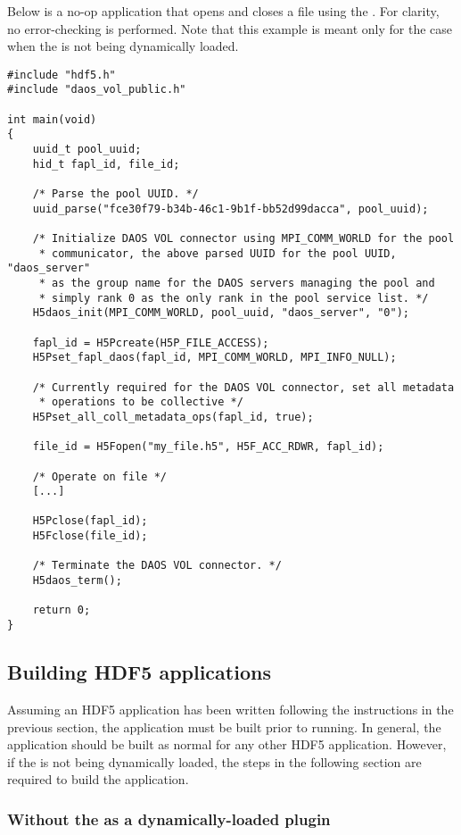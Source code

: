 \documentclass[../users_guide.tex]{subfiles}
\begin{document}
Below is a no-op application that opens and closes a file using the \dvc{}.
For clarity, no error-checking is performed. Note that this example is
meant only for the case when the \dvc{} is not being dynamically loaded.

\begin{verbatim}
#include "hdf5.h"
#include "daos_vol_public.h"

int main(void)
{
    uuid_t pool_uuid;
    hid_t fapl_id, file_id;

    /* Parse the pool UUID. */
    uuid_parse("fce30f79-b34b-46c1-9b1f-bb52d99dacca", pool_uuid);

    /* Initialize DAOS VOL connector using MPI_COMM_WORLD for the pool
     * communicator, the above parsed UUID for the pool UUID, "daos_server"
     * as the group name for the DAOS servers managing the pool and
     * simply rank 0 as the only rank in the pool service list. */
    H5daos_init(MPI_COMM_WORLD, pool_uuid, "daos_server", "0");

    fapl_id = H5Pcreate(H5P_FILE_ACCESS);
    H5Pset_fapl_daos(fapl_id, MPI_COMM_WORLD, MPI_INFO_NULL);

    /* Currently required for the DAOS VOL connector, set all metadata
     * operations to be collective */
    H5Pset_all_coll_metadata_ops(fapl_id, true); 

    file_id = H5Fopen("my_file.h5", H5F_ACC_RDWR, fapl_id);

    /* Operate on file */
    [...]

    H5Pclose(fapl_id);
    H5Fclose(file_id);

    /* Terminate the DAOS VOL connector. */
    H5daos_term();

    return 0;
}
\end{verbatim}

\subsection{Building HDF5 \dvc{} applications}

Assuming an HDF5 application has been written following the instructions in the previous section, the application must be built prior to running. In general, the
application should be built as normal for any other HDF5 application. However,
if the \dvc{} is not being dynamically loaded, the steps in the following section are required to build the application.

\subsubsection{Without the \dvc{} as a dynamically-loaded plugin}
\end{document}

